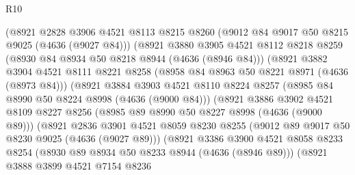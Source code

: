 \begin{lexlean}{R10}
\begin{coremodule}
                      (@8921
                        @2828
                        @3906
                        @4521
                        @8113
                        @8215
                        @8260
                        (@9012 @84 @9017 @50 @8215 @9025 (@4636 (@9027 @84)))
                        (@8921
                          @3880
                          @3905
                          @4521
                          @8112
                          @8218
                          @8259
                          (@8930 @84 @8934 @50 @8218 @8944 (@4636 (@8946 @84)))
                          (@8921
                            @3882
                            @3904
                            @4521
                            @8111
                            @8221
                            @8258
                            (@8958 @84 @8963 @50 @8221 @8971 (@4636 (@8973 @84)))
                            (@8921
                              @3884
                              @3903
                              @4521
                              @8110
                              @8224
                              @8257
                              (@8985 @84 @8990 @50 @8224 @8998 (@4636 (@9000 @84)))
                              (@8921
                                @3886
                                @3902
                                @4521
                                @8109
                                @8227
                                @8256
                                (@8985 @89 @8990 @50 @8227 @8998 (@4636 (@9000 @89)))
                                (@8921
                                  @2836
                                  @3901
                                  @4521
                                  @8059
                                  @8230
                                  @8255
                                  (@9012 @89 @9017 @50 @8230 @9025 (@4636 (@9027 @89)))
                                  (@8921
                                    @3386
                                    @3900
                                    @4521
                                    @8058
                                    @8233
                                    @8254
                                    (@8930 @89 @8934 @50 @8233 @8944 (@4636 (@8946 @89)))
                                    (@8921
                                      @3888
                                      @3899
                                      @4521
                                      @7154
                                      @8236

\end{coremodule}
\end{lexlean}
